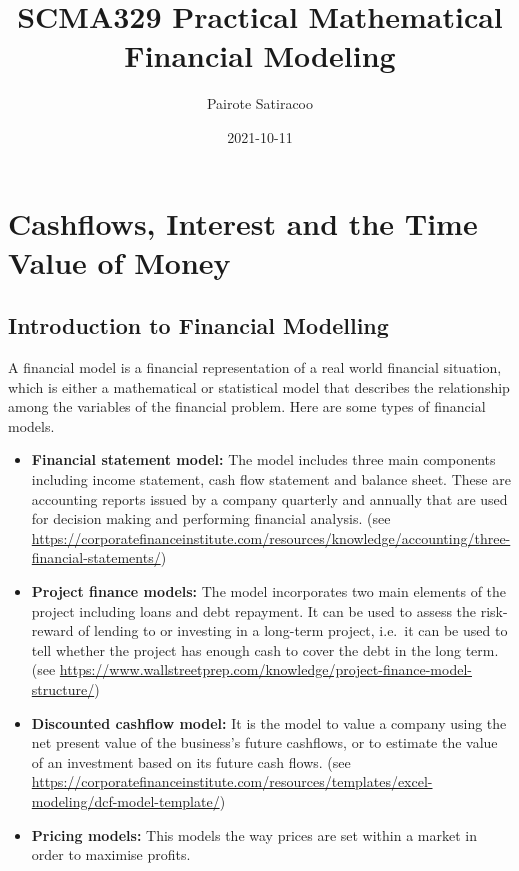 \documentclass[landscape, 20pt]{extreport}
\title{SCMA329 Practical Mathematical Financial Modeling}
\author{Pairote Satiracoo}
\date{2021-10-11}
\theoremstyle{definition}
\theoremstyle{definition}
\theoremstyle{definition}
\theoremstyle{definition}
\theoremstyle{remark}
\begin{document}
\maketitle

{
\setcounter{tocdepth}{1}
\tableofcontents
}
\hypertarget{cashflows-interest-and-the-time-value-of-money}{%
\chapter{Cashflows, Interest and the Time Value of Money}\label{cashflows-interest-and-the-time-value-of-money}}

\hypertarget{introduction-to-financial-modelling}{%
\section{Introduction to Financial Modelling}\label{introduction-to-financial-modelling}}

A financial model is a financial representation of a real world
financial situation, which is either a mathematical or statistical model
that describes the relationship among the variables of the financial
problem. Here are some types of financial models.

\begin{itemize}
\item
  \textbf{Financial statement model:} The model includes three main
  components including income statement, cash flow statement and
  balance sheet. These are accounting reports issued by a company
  quarterly and annually that are used for decision making and
  performing financial analysis. (see
  \url{https://corporatefinanceinstitute.com/resources/knowledge/accounting/three-financial-statements/})
\item
  \textbf{Project finance models:} The model incorporates two main elements
  of the project including loans and debt repayment. It can be used to
  assess the risk-reward of lending to or investing in a long-term
  project, i.e.~it can be used to tell whether the project has enough
  cash to cover the debt in the long term. (see
  \url{https://www.wallstreetprep.com/knowledge/project-finance-model-structure/})
\item
  \textbf{Discounted cashflow model:} It is the model to value a company
  using the net present value of the business's future cashflows, or
  to estimate the value of an investment based on its future cash
  flows. (see
  \url{https://corporatefinanceinstitute.com/resources/templates/excel-modeling/dcf-model-template/})
\item
  \textbf{Pricing models:} This models the way prices are set within a
  market in order to maximise profits.
\end{itemize}
\end{document}
